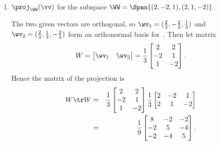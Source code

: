 \begin{example}
\begin{enumerate}
\item \(\proj_\WW(\vv)\) for the subspace \(\WW=\Span\{(2,-2,1),(2,1,-2)\}\).
\begin{solution} 
The two given vectors are orthogonal, so \(\wv_1=(\frac23,-\frac23,\frac13)\) and  \(\wv_2=(\frac23,\frac13,-\frac23)\) form an orthonormal basis for~\WW. 
Then let matrix
\begin{equation*}
W=\begin{bmatrix} \wv_1&\wv_2 \end{bmatrix}
=\frac13\begin{bmatrix} 2&2\\-2&1\\1&-2 \end{bmatrix}.
\end{equation*}
Hence the matrix of the projection is
\begin{eqnarray*}
W\tr W&=&\frac13\begin{bmatrix} 2&2\\-2&1\\1&-2 \end{bmatrix}
\frac13\begin{bmatrix} 2&-2&1\\ 2&1&-2\end{bmatrix}
\\&=&\frac19\begin{bmatrix} 8&-2&-2\\-2&5&-4\\-2&-4&5 \end{bmatrix}.
\end{eqnarray*}
\end{solution}



\end{enumerate}
\end{example}
